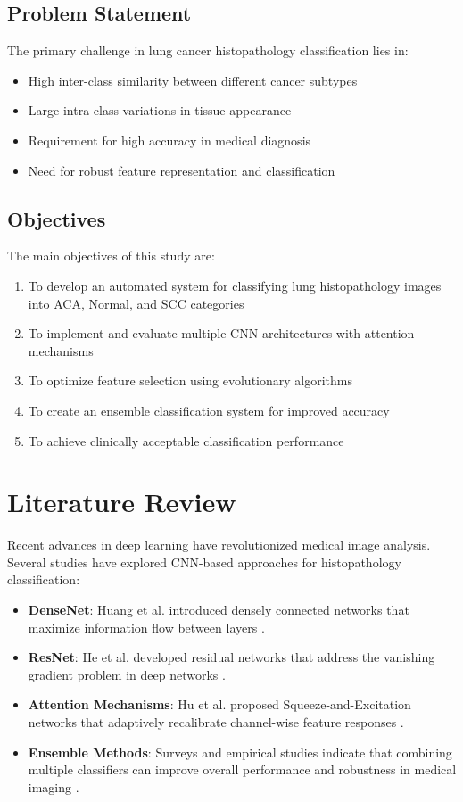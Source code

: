 \documentclass[journal]{IEEEtran}
\begin{document}
\subsection{Problem Statement}

The primary challenge in lung cancer histopathology classification lies in:
\begin{itemize}
    \item High inter-class similarity between different cancer subtypes
    \item Large intra-class variations in tissue appearance
    \item Requirement for high accuracy in medical diagnosis
    \item Need for robust feature representation and classification
\end{itemize}

\subsection{Objectives}

The main objectives of this study are:
\begin{enumerate}
    \item To develop an automated system for classifying lung histopathology images into ACA, Normal, and SCC categories
    \item To implement and evaluate multiple CNN architectures with attention mechanisms
    \item To optimize feature selection using evolutionary algorithms
    \item To create an ensemble classification system for improved accuracy
    \item To achieve clinically acceptable classification performance
\end{enumerate}

\section{Literature Review}

Recent advances in deep learning have revolutionized medical image analysis. Several studies have explored CNN-based approaches for histopathology classification:

\begin{itemize}
    \item \textbf{DenseNet}: Huang et al. introduced densely connected networks that maximize information flow between layers \cite{huang2017densenet}.
    \item \textbf{ResNet}: He et al. developed residual networks that address the vanishing gradient problem in deep networks \cite{he2016resnet}.
    \item \textbf{Attention Mechanisms}: Hu et al. proposed Squeeze-and-Excitation networks that adaptively recalibrate channel-wise feature responses \cite{hu2018senet}.
    \item \textbf{Ensemble Methods}: Surveys and empirical studies indicate that combining multiple classifiers can improve overall performance and robustness in medical imaging \cite{litjens2017survey}.
\end{itemize}
\end{document}
